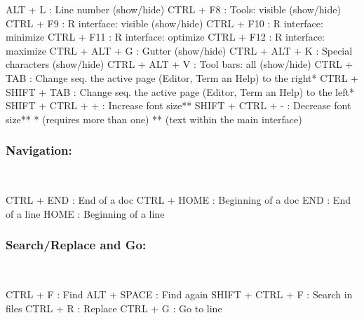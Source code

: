 \vspace{-0.5cm}
\begin{Rtables}[caption={[Visualization keyboard shortcuts]
    Visualization keyboard shortcuts},
  label=hotkey:visualization]
  ALT  + L            : Line number (show/hide)
  CTRL  + F8          : Tools: visible (show/hide)
  CTRL  + F9          : R interface: visible (show/hide)
  CTRL  + F10         : R interface: minimize
  CTRL  + F11         : R interface: optimize
  CTRL  + F12         : R interface: maximize
  CTRL  + ALT  + G    : Gutter (show/hide)
  CTRL  + ALT  + K    : Special characters (show/hide)
  CTRL  + ALT  + V    : Tool bars: all (show/hide)
  CTRL  + TAB         : Change seq. the active page
                        (Editor, Term an Help) to the right*
  CTRL  + SHIFT + TAB : Change seq. the active page
                        (Editor, Term an Help) to the left*
  SHIFT + CTRL + +    : Increase font size**
  SHIFT + CTRL + -    : Decrease font size**
  *  (requires more than one)
  ** (text within the main interface)
\end{Rtables}


\subsubsection{Navigation:}\\

\vspace{-0.5cm}
\begin{Rtables}[caption={[Navigation keyboard shortcuts]
    Navigation keyboard shortcuts},
  label=hotkey:navigation]
  CTRL  + END  : End of a doc
  CTRL  + HOME : Beginning of a doc
  END          : End of a line
  HOME         : Beginning of a line
\end{Rtables}

\subsubsection{Search/Replace and Go:}\\

\vspace{-0.5cm}
\begin{Rtables}[caption={[Search/Replace and go keyboard shortcuts]
    Search/Replace and go keyboard shortcuts},
  label=hotkey:search]
  CTRL  + F        : Find
  ALT   + SPACE    : Find again
  SHIFT + CTRL + F : Search in files
  CTRL  + R        : Replace
  CTRL  + G        : Go to line
\end{Rtables}


